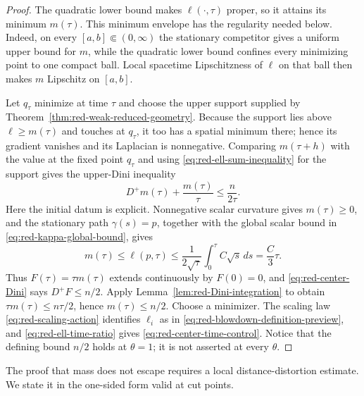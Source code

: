 \documentclass[10pt]{coll-l}
\theoremstyle{definition}
\theoremstyle{remark}
\numberwithin{section}{chapter}
\numberwithin{equation}{chapter}
\begin{document}
\begin{proof}
The quadratic lower bound makes $\ell(\cdot,\tau)$ proper, so it attains its
minimum $m(\tau)$.  This minimum envelope has the regularity needed below.
Indeed, on every $[a,b]\Subset(0,\infty)$ the stationary competitor gives a
uniform upper bound for $m$, while the quadratic lower bound confines every
minimizing point to one compact ball.  Local spacetime Lipschitzness of
$\ell$ on that ball then makes $m$ Lipschitz on $[a,b]$.

Let $q_\tau$ minimize at time $\tau$ and choose the upper support supplied by
Theorem~\ref{thm:red-weak-reduced-geometry}.  Because the support lies above
$\ell\geq m(\tau)$ and touches at $q_\tau$, it too has a spatial minimum
there; hence its gradient vanishes and its Laplacian is nonnegative.
Comparing $m(\tau+h)$ with the value at the fixed point $q_\tau$ and using
\eqref{eq:red-ell-sum-inequality} for the support gives the upper-Dini
inequality
\begin{equation}
                         D^+m(\tau)+\frac{m(\tau)}\tau
                         \leq\frac n{2\tau}.             \label{eq:red-center-Dini}
\end{equation}
Here the initial datum is explicit.  Nonnegative scalar curvature gives
$m(\tau)\geq0$, and the stationary path $\gamma(s)=p$, together with the
global scalar bound in \eqref{eq:red-kappa-global-bound}, gives
\begin{equation}
             m(\tau)\leq\ell(p,\tau)
             \leq\frac{1}{2\sqrt\tau}
                    \int_0^\tau C\sqrt s\,ds
             =\frac C3\tau.                            \label{eq:red-center-initial-data}
\end{equation}
Thus $F(\tau)=\tau m(\tau)$ extends continuously by $F(0)=0$, and
\eqref{eq:red-center-Dini} says $D^+F\leq n/2$.  Apply
Lemma~\ref{lem:red-Dini-integration} to obtain
$\tau m(\tau)\leq n\tau/2$, hence $m(\tau)\leq n/2$.
Choose a minimizer.  The scaling law
\eqref{eq:red-scaling-action} identifies $\ell_i$ as in
\eqref{eq:red-blowdown-definition-preview}, and
\eqref{eq:red-ell-time-ratio} gives
\eqref{eq:red-center-time-control}.  Notice that the defining bound
$n/2$ holds at $\theta=1$; it is not asserted at every $\theta$.
\end{proof}

The proof that mass does not escape requires a local distance-distortion
estimate.  We state it in the one-sided form valid at cut points.
\end{document}
